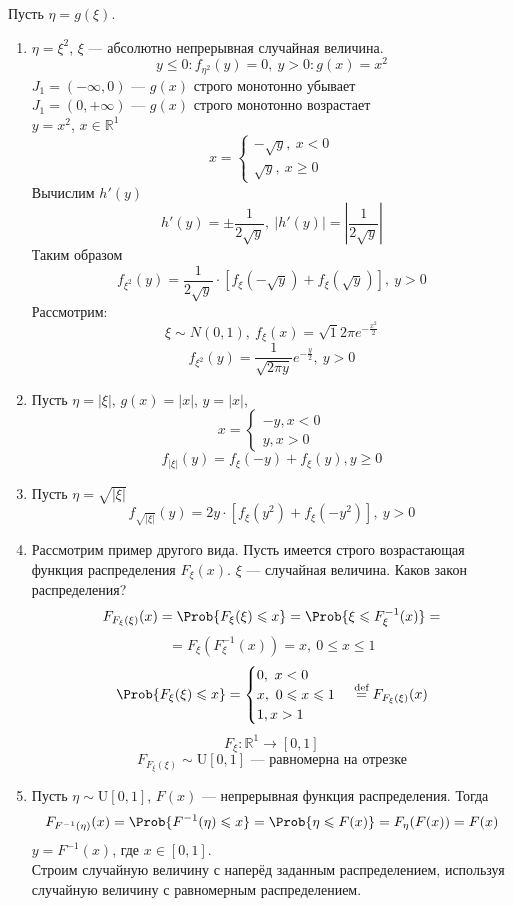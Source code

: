 \begin{example}
	Пусть $\eta = g(\xi)$.
\begin{enumerate}
	\item $\eta = \xi^2$, $\xi$ --- абсолютно непрерывная случайная величина.
	\[
		y \leqslant 0: f_{\eta^2} (y) = 0, \ y > 0 : g(x) = x^2
	\]
	$J_1 = (-\infty, 0)$ --- $g(x)$ строго монотонно убывает \\
	$J_1 = (0, +\infty)$ --- $g(x)$ строго монотонно возрастает\\
	$y = x^2$, $x \in \mathbb{R}^1$
	\[
		x = \begin{cases}
		-\sqrt{y}, \ x < 0 \\
		\sqrt{y}, \ x \geqslant 0 
		\end{cases}
	\]
	Вычислим $h'(y)$
	\[
		h'(y) = \pm \frac{1}{2\sqrt{y}}, \ | h'(y) | = \left| \frac{1}{2\sqrt{y}} \right|
	\]
	Таким образом
	\[
		f_{\xi^2} (y) = \frac{1}{2 \sqrt{y}} \cdot \left[ f_{\xi} (-\sqrt{y}) + f_{\xi} (\sqrt{y}) \right], \ y > 0
	\]
	Рассмотрим:
	\[
		\xi \sim N(0, 1), \ f_{\xi} (x) = \sqrt{1}{2\pi} e^{-\frac{x^2}{2}}
	\]
	\[
		f_{\xi^2} (y) = \frac{1}{\sqrt{2 \pi y}} e^{- \frac{y}{2}}, \ y > 0
	\]
	\item Пусть $\eta = |\xi|$, $g(x) = |x|$, $y = |x|$,
	\[
		x = \begin{cases}
		-y, x < 0 \\
		y, x > 0
		\end{cases}
	\]
	\[
		f_{|\xi|} (y) = f_{\xi} (-y) + f_{\xi} (y), y \geqslant 0
	\]
	
	\item Пусть $\eta = \sqrt{|\xi|}$
	\[
		f_{\sqrt{|\xi|}} (y) = 2y \cdot \left[ f_{\xi} (y^2) + f_{\xi} (-y^2) \right], \ y > 0
	\]
	
	\item Рассмотрим пример другого вида. Пусть имеется строго возрастающая функция распределения $F_{\xi} (x)$. $\xi$ --- случайная величина. Каков закон распределения?
	\[
		F_{F_{\xi}(\xi)} (x) = \Prob \{ F_{\xi} (\xi) \leqslant x \} = \Prob \{ \xi \leqslant F_{\xi}^{-1} (x) \} =
	\]
	\[
		= F_{\xi} (F_{\xi}^{-1} (x)) = x, \ 0 \leqslant x \leqslant 1
	\]
	\[
		\Prob \{ F_{\xi} (\xi) \leqslant x \} = \begin{cases}
			0, \ x < 0 \\
			x, \ 0 \leqslant x \leqslant 1 \\
			1, x > 1
		\end{cases} \overset{\textrm{def}}{=} F_{F_{\xi}(\xi)} (x)
	\]
	\[
		F_{\xi} : \mathbb{R}^1 \to [0, 1]
	\]
	\[
		F_{F_{\xi}(\xi)} \sim \textrm{U} [0, 1] \text{ --- равномерна на отрезке}
	\]

	\item Пусть $\eta \sim \textrm{U} [0, 1]$, $F(x)$ --- непрерывная функция распределения. Тогда
	\[
		F_{F^{-1}(\eta)} (x) = \Prob \{ F^{-1} (\eta) \leqslant x \} = \Prob \{ \eta \leqslant F(x) \} = F_{\eta} (F(x)) = F(x)
	\]
	$y = F^{-1} (x)$, где $x \in [0, 1]$. \\
	Строим случайную величину с наперёд заданным распределением, используя случайную величину с равномерным распределением. \\
\end{enumerate}
\end{example}
